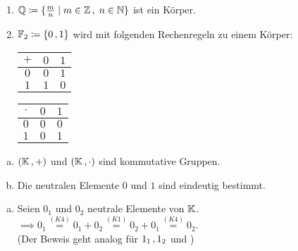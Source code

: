 \documentclass[../ana1.tex]{subfiles}
\begin{document}
\begin{bspe}\leavevmode
	\begin{enumerate}[(1)]
		\item \(\mathbb{Q} \coloneqq \{\frac{m}{n}  \; \vert  \; m \in \mathbb{Z} \operatorname{,}  \; n \in \mathbb{N}\} \) ist ein Körper.
		\item \(\mathbb{F}_{2} \coloneqq \{0 \operatorname{,} 1\} \) wird mit folgenden Rechenregeln zu einem Körper:
			  \begin{center}
				\begin{tabular}{c|cc}
					\(+ \) & \(0 \) & \(1 \) \\
					\midrule
					\(0 \) & \(0 \) & \(1 \) \\
					\(1 \) & \(1 \) & \(0 \)
				\end{tabular}
				\qquad
				\begin{tabular}{c|cc}
					\(\cdot \) & \(0 \) & \(1 \) \\
					\midrule
					\(0 \)     & \(0 \) & \(0 \) \\
					\(1 \)     & \(0 \) & \(1 \)
				\end{tabular}
			   \end{center}
	\end{enumerate}
\end{bspe}

\iftoggle{short}{}{\newpage}%

\begin{bem}\leavevmode
	\begin{enumerate}[(a)]
		\item \((\mathbb{K} \operatorname{,} +) \) und \((\mathbb{K} \operatorname{,} \cdot) \) sind kommutative Gruppen.
		\item Die neutralen Elemente \(0 \) und \(1 \) sind eindeutig bestimmt.
	\end{enumerate}
\end{bem}
\begin{bew}
	\begin{enumerate}[(b)]
		\item Seien \(0_{1} \) und \(0_{2} \) neutrale Elemente von \(\mathbb{K} \). \\
			  \(\implies 0_{1} \overset{ \hyperref[ax:K4]{(K4)} }{=} 0_{1} + 0_{2} \overset{ \hyperref[ax:K1]{(K1)} }{=} 0_{2} + 0_{1} \overset{ \hyperref[ax:K4]{(K4)} }{=} 0_{2} \). \\
			  (Der Beweis geht analog für \(1_{1} \operatorname{,} 1_{2} \) und \gqq{\(\cdot \)})\qedhere
	\end{enumerate}
\end{bew}
\end{document}
